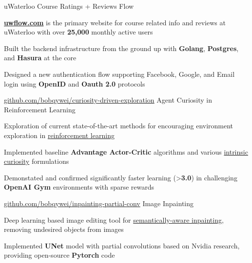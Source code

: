 
\begin{cventries}
  \cventry
    {uWaterloo Course Ratings + Reviews} %
    {Flow} %
    {} %
    {} %
    {
      \begin{cvitems} %
        \item {\href{https://uwflow.com}{\textbf{uwflow.com}} is the primary website for course related info and reviews at uWaterloo with over \textbf{25,000} monthly active users}
        \item {Built the backend infrastructure from the ground up with \textbf{Golang}, \textbf{Postgres}, and \textbf{Hasura} at the core}
        \item {Designed a new authentication flow supporting Facebook, Google, and Email login using \textbf{OpenID} and \textbf{Oauth 2.0} protocols}
      \end{cvitems}
    }

  \cventry
    {\href{https://github.com/bobqywei/curiosity-driven-exploration}{github.com/bobqywei/curiosity-driven-exploration}} %
    {Agent Curiosity in Reinforcement Learning} %
    {} %
    {} %
    {
      \begin{cvitems} %
      	\item {Exploration of current state-of-the-art methods for encouraging environment exploration in \underline{reinforcement learning}}
      	\item {Implemented baseline \textbf{Advantage Actor-Critic} algorithms and various \underline{intrinsic curiosity} formulations}
      	\item {Demonstated and confirmed significantly faster learning (>\textbf{3.0\times}) in challenging \textbf{OpenAI Gym} environments with sparse rewards}
      \end{cvitems}
    }

  \cventry
    {\href{https://github.com/bobqywei/inpainting-partial-conv}{github.com/bobqywei/inpainting-partial-conv}} %
    {Image Inpainting} %
    {} %
    {} %
    {
      \begin{cvitems} %
        \item {Deep learning based image editing tool for \underline{semantically-aware inpainting}, removing undesired objects from images}
        \item {Implemented \textbf{UNet} model with partial convolutions based on Nvidia research, providing open-source \textbf{Pytorch} code}
      \end{cvitems}
    }
\end{cventries}